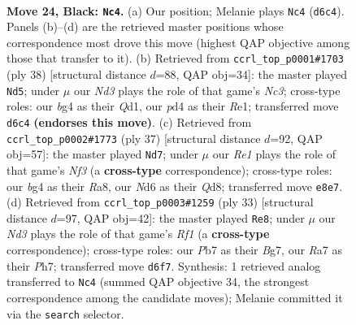 \documentclass[11pt]{article}
\begin{document}
\clearpage

\begin{figure}[p]\centering
\begin{subfigure}{0.46\textwidth}\centering
\resizebox{\linewidth}{!}{%
\newchessgame
\chessboard[
  setfen={2bqrb1k/rp1p3p/p2npp2/2P4Q/P2P2B1/2N2N2/1P3P1P/R1B2RK1 b - - 0 24},
  showmover=false,
  pgfstyle=straightmove, color=movearrow, markmove={d6-c4}
]}
\caption{}
\end{subfigure}\hfill
\begin{subfigure}{0.46\textwidth}\centering
\resizebox{\linewidth}{!}{%
\newchessgame
\chessboard[
  setfen={r5k1/2pqrppp/2np4/p1p5/2PbPP2/1PN4P/P2B2P1/3QRR1K w - - 1 20},
  showmover=false,
  pgfstyle=straightmove, color=movearrow, markmove={c3-d5}
]}
\caption{}
\end{subfigure}
\\[4pt]
\begin{subfigure}{0.46\textwidth}\centering
\resizebox{\linewidth}{!}{%
\newchessgame
\chessboard[
  setfen={r2qr1k1/1b2bppp/3p1n2/p7/Pp1QP3/3B1N1P/1P3PP1/R1B1R1K1 b - - 1 19},
  showmover=false,
  pgfstyle=straightmove, color=movearrow, markmove={f6-d7}
]}
\caption{}
\end{subfigure}\hfill
\begin{subfigure}{0.46\textwidth}\centering
\resizebox{\linewidth}{!}{%
\newchessgame
\chessboard[
  setfen={r1bq1r1k/1p4bp/2pBnppn/p7/4P3/Q1N2N2/PP2BPPP/R3R1K1 b - - 1 17},
  showmover=false,
  pgfstyle=straightmove, color=movearrow, markmove={f8-e8}
]}
\caption{}
\end{subfigure}
\caption{\textbf{Move 24, Black: \texttt{Nc4}.} (a) Our position; Melanie plays \texttt{Nc4} (\texttt{d6c4}). Panels (b)--(d) are the retrieved master positions whose correspondence most drove this move (highest QAP objective among those that transfer to it). (b) Retrieved from \texttt{ccrl\_top\_p0001\#1703} (ply 38) [structural distance $d$=88, QAP obj=34]: the master played \texttt{Nd5}; under $\mu$ our \emph{Nd3} plays the role of that game's \emph{Nc3}; cross-type roles: our \emph{b}g4 as their \emph{Q}d1, our \emph{p}d4 as their \emph{R}e1; transferred move \texttt{d6c4} \textbf{(endorses this move)}. (c) Retrieved from \texttt{ccrl\_top\_p0002\#1773} (ply 37) [structural distance $d$=92, QAP obj=57]: the master played \texttt{Nd7}; under $\mu$ our \emph{Re1} plays the role of that game's \emph{Nf3} (a \textbf{cross-type} correspondence); cross-type roles: our \emph{b}g4 as their \emph{R}a8, our \emph{N}d6 as their \emph{Q}d8; transferred move \texttt{e8e7}. (d) Retrieved from \texttt{ccrl\_top\_p0003\#1259} (ply 33) [structural distance $d$=97, QAP obj=42]: the master played \texttt{Re8}; under $\mu$ our \emph{Nd3} plays the role of that game's \emph{Rf1} (a \textbf{cross-type} correspondence); cross-type roles: our \emph{P}b7 as their \emph{B}g7, our \emph{R}a7 as their \emph{P}h7; transferred move \texttt{d6f7}. Synthesis: 1 retrieved analog transferred to \texttt{Nc4} (summed QAP objective 34, the strongest correspondence among the candidate moves); Melanie committed it via the \texttt{search} selector.}
\label{fig:thought-m47}
\end{figure}
\end{document}
